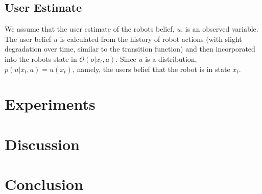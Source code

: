 \documentclass[graybox]{svmult}
\begin{document}
\subsection{User Estimate}
We assume that the user estimate of the robots belief, $u$, is an observed
variable. The user belief $u$ is calculated from the history of robot actions
(with slight degradation over time, similar to the transition function) and
then incorporated into the robots state in $\mathcal{O}(o | x_t, a)$. Since $u$
is a distribution, $p(u | x_t, a)  = u(x_t)$, namely, the users belief that the
robot is in state $x_t$.

\section{Experiments}
\section{Discussion}

\section{Conclusion}





\citet{tellex11}




\end{document}
